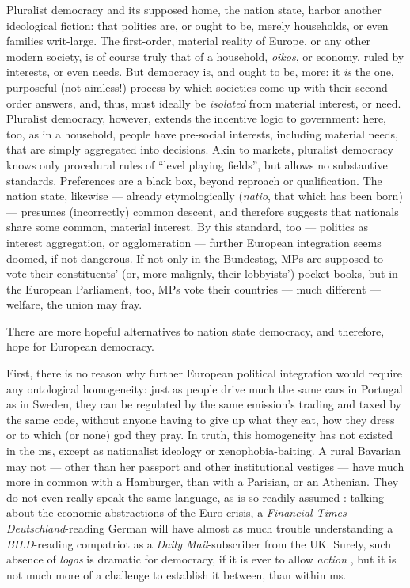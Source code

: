Pluralist democracy and its supposed home, the nation state, harbor another ideological fiction:
that polities are, or ought to be, merely households, or even families writ-large.
The first-order, material reality of Europe, or any other modern society, is of course truly that of a household, \emph{oikos}, or economy, ruled by interests, or even needs.
But democracy is, and ought to be, more:
it \emph{is} the one, purposeful (not aimless!) process by which societies come up with their second-order answers, and, thus, must ideally be \emph{isolated} from material interest, or need.
Pluralist democracy, however, extends the incentive logic to government:
here, too, as in a household, people have pre-social interests, including material needs, that are simply aggregated into decisions.
Akin to markets, pluralist democracy knows only procedural rules of ``level playing fields'', but allows no substantive standards.
Preferences are a black box, beyond reproach or qualification.
The nation state, likewise --- already etymologically (\emph{natio}, that which has been born) --- presumes (incorrectly) common descent, and therefore suggests that nationals share some common, material interest.
By this standard, too --- politics as interest aggregation, or agglomeration --- further European integration seems doomed, if not dangerous.
If not only in the Bundestag, MPs are supposed to vote their constituents' (or, more malignly, their lobbyists') pocket books, but in the European Parliament, too, MPs vote their countries --- much different --- welfare, the union may fray.

There are more hopeful alternatives to nation state democracy, and therefore, hope for European democracy.

First, there is no reason why further European political integration would require any ontological homogeneity:
just as people drive much the same cars in Portugal as in Sweden, they can be regulated by the same emission's trading and taxed by the same code, without anyone having to give up what they eat, how they dress or to which (or none) god they pray.
In truth, this homogeneity has not existed in the \gls{ms}, except as nationalist ideology or xenophobia-baiting.
A rural Bavarian may not --- other than her passport and other institutional vestiges --- have much more in common with a Hamburger, than with a Parisian, or an Athenian.
They do not even really speak the same language, as is so readily assumed \citep{Kymlicka-2001-aa}:
talking about the economic abstractions of the Euro crisis, a \emph{Financial Times Deutschland}-reading German will have almost as much trouble understanding a \emph{BILD}-reading compatriot as a \emph{Daily Mail}-subscriber from the UK.
Surely, such absence of \emph{logos} is dramatic for democracy, if it is ever to allow \emph{action} \citep{Arendt1958}, but it is not much more of a challenge to establish it between, than within \gls{ms}.

